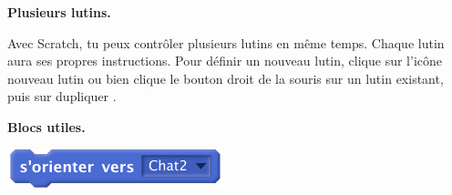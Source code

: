 \documentclass[class=report,crop=false, 12pt]{standalone}
\begin{document}
\begin{activite}
\bigskip
\textbf{Plusieurs lutins.}

Avec Scratch, tu peux contrôler plusieurs lutins en même temps.
Chaque lutin aura ses propres instructions.
Pour définir un nouveau lutin, clique sur l'icône \og nouveau lutin \fg{}
ou bien clique le bouton droit de la souris sur un lutin existant, puis sur \og dupliquer \fg{}.


\bigskip


\textbf{Blocs utiles.}

\begin{center}
  \includegraphics[scale=\scalebloc]{bloc-08-ex1} 
\end{center} 


  
\end{activite}
\end{document}
